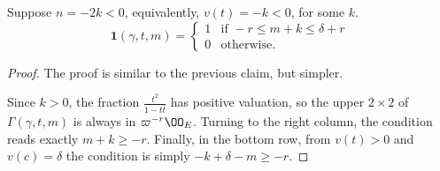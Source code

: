 \begin{claim}
  Suppose $n = -2k < 0$, equivalently, $v(t) = -k < 0$, for some $k$.
  \[
    \mathbf{1}(\gamma, t, m) =
    \begin{cases}
      1 & \text{if } -r \le m+k \le \delta+r \\
      0 & \text{otherwise.}
    \end{cases}
  \]
\end{claim}
\begin{proof}
  The proof is similar to the previous claim, but simpler.

  Since $k > 0$, the fraction $\frac{t^2}{1-t \bar t}$ has positive valuation,
  so the upper $2 \times 2$ of $\Gamma(\gamma, t, m)$ is always in $\varpi^{-r}\OO_E$.
  Turning to the right column, the condition reads exactly $m+k \geq -r$.
  Finally, in the bottom row, from $v(t) > 0$ and $v(c) = \delta$
  the condition is simply $-k+\delta-m \geq -r$.
\end{proof}


